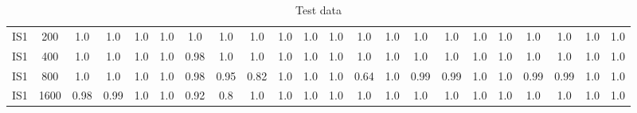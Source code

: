 \documentclass[10pt]{article}
\begin{document}
\begin{table}
\begin{tabular}{ cc||c c c c | c c c c | c c c c | c c c c| c c c c}
 					IS1 & 200 & 1.0 & 1.0 & 1.0 & 1.0 & 1.0 & 1.0 & 1.0 & 1.0& 1.0 & 1.0 & 1.0 & 1.0& 1.0 & 1.0 & 1.0 & 1.0 & 1.0 & 1.0 & 1.0 & 1.0\\ 
 					IS1 & 400 & 1.0 & 1.0 & 1.0 & 1.0 & 0.98 & 1.0 & 1.0 & 1.0& 1.0 & 1.0 & 1.0 & 1.0& 1.0 & 1.0 & 1.0 & 1.0 & 1.0 & 1.0 & 1.0 & 1.0\\ 
 					IS1 & 800 & 1.0 & 1.0 & 1.0 & 1.0 & 0.98 & 0.95 & 0.82 & 1.0& 1.0 & 1.0 & 0.64 & 1.0& 0.99 & 0.99 & 1.0 & 1.0 & 0.99 & 0.99 & 1.0 & 1.0\\ 
 					IS1 & 1600 & 0.98 & 0.99 & 1.0 & 1.0 & 0.92 & 0.8 & 1.0 & 1.0& 1.0 & 1.0 & 1.0 & 1.0& 1.0 & 1.0 & 1.0 & 1.0 & 1.0 & 1.0 & 1.0 & 1.0\\ \hline
 \hline
  \end{tabular}
  \caption{Test data}
\end{table}


\newpage
\end{document}
